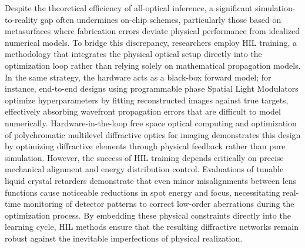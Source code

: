 \documentclass[11pt]{article}
\begin{document}
Despite the theoretical efficiency of all-optical inference, a significant simulation-to-reality gap often undermines on-chip schemes, particularly those based on metasurfaces where fabrication errors deviate physical performance from idealized numerical models. To bridge this discrepancy, researchers employ HIL training, a methodology that integrates the physical optical setup directly into the optimization loop rather than relying solely on mathematical propagation models. In the same strategy, the hardware acts as a black-box forward model; for instance, end-to-end designs using programmable phase Spatial Light Modulators optimize hyperparameters by fitting reconstructed images against true targets, effectively absorbing wavefront propagation errors that are difficult to model numerically. Hardware-in-the-loop free space optical computing and optimization of polychromatic multilevel diffractive optics for imaging demonstrates this design by optimizing diffractive elements through physical feedback rather than pure simulation. \citep{doi_10_1109_icton67126_2025_11125227_383c0a4a} However, the success of HIL training depends critically on precise mechanical alignment and energy distribution control. Evaluations of tunable liquid crystal retarders demonstrate that even minor misalignments between lens functions cause noticeable reductions in spot energy and focus, necessitating real-time monitoring of detector patterns to correct low-order aberrations during the optimization process. By embedding these physical constraints directly into the learning cycle, HIL methods ensure that the resulting diffractive networks remain robust against the inevitable imperfections of physical realization. \citep{doi_10_1038_s41598_025_19638_8_1b2db1c9} \citep{doi_10_1364_oe_461549_b2d41b3f} \citep{doi_10_1021_acsphotonics_4c01284_s001_10346917}
\end{document}

